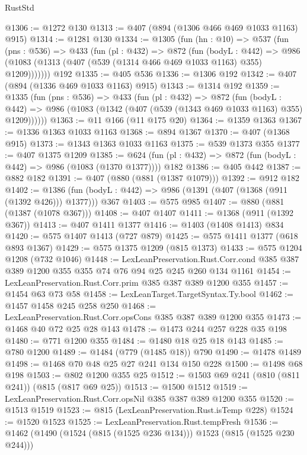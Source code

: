 \begin{lexlean}{RustStd}
\begin{coremodule}
@1306 := @1272 @130
@1313 := @407 (@894 (@1306 @466 @469 @1033 @1163) @915)
@1314 := @1281 @130
@1334 := @1305
    (fun (hn : @10) =>
    @537
      (fun (pns : @536) =>
      @433
        (fun (pl : @432) =>
        @872
          (fun (bodyL : @442) =>
          @986 (@1083 (@1313 (@407 (@539 (@1314 @466 @469 @1033 @1163) @355) @1209)))))))
    @192
@1335 := @405 @536
@1336 := @1306 @192
@1342 := @407 (@894 (@1336 @469 @1033 @1163) @915)
@1343 := @1314 @192
@1359 := @1335
    (fun (pns : @536) =>
    @433
      (fun (pl : @432) =>
      @872
        (fun (bodyL : @442) =>
        @986 (@1083 (@1342 (@407 (@539 (@1343 @469 @1033 @1163) @355) @1209))))))
@1363 := @11 @166 (@11 @175 @20)
@1364 := @1359 @1363
@1367 := @1336 @1363 @1033 @1163
@1368 := @894 @1367
@1370 := @407 (@1368 @915)
@1373 := @1343 @1363 @1033 @1163
@1375 := @539 @1373 @355
@1377 := @407 @1375 @1209
@1385 := @624 (fun (pl : @432) => @872 (fun (bodyL : @442) => @986 (@1083 (@1370 @1377)))) @182
@1386 := @405 @442
@1387 := @882 @182
@1391 := @407 (@880 (@881 (@1387 @1079)))
@1392 := @912 @182
@1402 := @1386 (fun (bodyL : @442) => @986 (@1391 (@407 (@1368 (@911 (@1392 @426))) @1377))) @367
@1403 := @575 @985
@1407 := @880 (@881 (@1387 (@1078 @367)))
@1408 := @407 @1407
@1411 := @1368 (@911 (@1392 @367))
@1413 := @407 @1411 @1377
@1416 := @1403 (@1408 @1413) @834
@1420 := @575 @1407 @1413 (@727 @879)
@1425 := @575 @1411 @1377 (@618 @893 @1367)
@1429 := @575 @1375 @1209 (@815 @1373)
@1433 := @575 @1204 @1208 (@732 @1046)
@1448 := LexLeanPreservation.Rust.Corr.cond
    @385
    @387
    @389
    @1200
    @355
    @355
    @74
    @76
    @94
    @25
    @245
    @260
    @134
    @1161
@1454 := LexLeanPreservation.Rust.Corr.prim @385 @387 @389 @1200 @355
@1457 := @1454 @63 @73 @58
@1458 := LexLeanTarget.TargetSyntax.Ty.bool
@1462 := @1457 @1458 @245 @258 @250
@1468 := LexLeanPreservation.Rust.Corr.opsCons @385 @387 @389 @1200 @355
@1473 := @1468 @40 @72 @25 @28 @143
@1478 := @1473 @244 @257 @228 @35 @198
@1480 := @771 @1200 @355
@1484 := @1480 @18 @25 @18 @143
@1485 := @780 @1200
@1489 := @1484 (@779 (@1485 @18)) @790
@1490 := @1478 @1489
@1498 := @1468 @70 @48 @25 @27 @241 @134 @150 @228
@1500 := @1498 @68 @198
@1503 := @802 @1200 @355 @25
@1512 := @1503 @69 @241 (@810 (@811 @241)) (@815 (@817 @69 @25))
@1513 := @1500 @1512
@1519 := LexLeanPreservation.Rust.Corr.opsNil @385 @387 @389 @1200 @355
@1520 := @1513 @1519
@1523 := @815 (LexLeanPreservation.Rust.isTemp @228)
@1524 := @1520 @1523
@1525 := LexLeanPreservation.Rust.tempFresh
@1536 := @1462 (@1490 (@1524 (@815 (@1525 @236 @134))) @1523 (@815 (@1525 @230 @244)))

\end{coremodule}
\end{lexlean}
